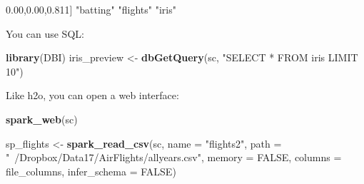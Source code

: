 \documentclass[]{book}
\newenvironment{Shaded}{\begin{snugshade}}{\end{snugshade}}
\newcommand{\KeywordTok}[1]{\textcolor[rgb]{0.13,0.29,0.53}{\textbf{#1}}}
\newcommand{\DataTypeTok}[1]{\textcolor[rgb]{0.13,0.29,0.53}{#1}}
\newcommand{\DecValTok}[1]{\textcolor[rgb]{0.00,0.00,0.81}{#1}}
\newcommand{\StringTok}[1]{\textcolor[rgb]{0.31,0.60,0.02}{#1}}
\newcommand{\OtherTok}[1]{\textcolor[rgb]{0.56,0.35,0.01}{#1}}
\newcommand{\ControlFlowTok}[1]{\textcolor[rgb]{0.13,0.29,0.53}{\textbf{#1}}}
\newcommand{\OperatorTok}[1]{\textcolor[rgb]{0.81,0.36,0.00}{\textbf{#1}}}
\newcommand{\NormalTok}[1]{#1}
\theoremstyle{definition}
\theoremstyle{definition}
\theoremstyle{definition}
\theoremstyle{remark}
\begin{document}
\begin{Shaded}
\begin{Highlighting}[]
\NormalTok{[}\DecValTok{1}\NormalTok{] }\StringTok{"batting"} \StringTok{"flights"} \StringTok{"iris"}
\end{Highlighting}
\end{Shaded}

You can use SQL:

\begin{Shaded}
\begin{Highlighting}[]
\KeywordTok{library}\NormalTok{(DBI)}
\NormalTok{iris_preview <-}\StringTok{ }\KeywordTok{dbGetQuery}\NormalTok{(sc, }\StringTok{"SELECT * FROM iris LIMIT 10"}\NormalTok{)}
\end{Highlighting}
\end{Shaded}

Like h2o, you can open a web interface:

\begin{Shaded}
\begin{Highlighting}[]
\KeywordTok{spark_web}\NormalTok{(sc)}
\end{Highlighting}
\end{Shaded}

\begin{Shaded}
\end{Shaded}

\begin{Shaded}
\begin{Highlighting}[]
\NormalTok{sp_flights <-}\StringTok{ }\KeywordTok{spark_read_csv}\NormalTok{(sc, }
                             \DataTypeTok{name =} \StringTok{"flights2"}\NormalTok{, }
                             \DataTypeTok{path =} \StringTok{"~/Dropbox/Data17/AirFlights/allyears.csv"}\NormalTok{, }
                             \DataTypeTok{memory =} \OtherTok{FALSE}\NormalTok{, }
                             \DataTypeTok{columns =}\NormalTok{ file_columns, }
                             \DataTypeTok{infer_schema =} \OtherTok{FALSE}\NormalTok{)}
\end{Highlighting}
\end{Shaded}
\end{document}
